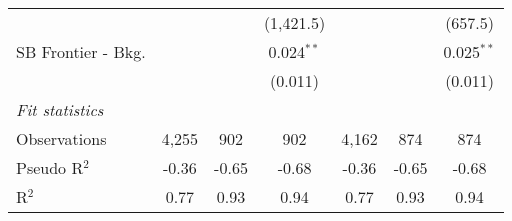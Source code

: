 \begin{tabular}{lcccccc}
                                &               &             & (1,421.5)      &               &         & (657.5)\\   
   SB Frontier - Bkg.           &               &             & 0.024$^{**}$   &               &         & 0.025$^{**}$\\   
                                &               &             & (0.011)        &               &         & (0.011)\\   
   \midrule
   \emph{Fit statistics}\\
   Observations                 & 4,255         & 902         & 902            & 4,162         & 874     & 874\\  
   Pseudo R$^2$                 & -0.36         & -0.65       & -0.68          & -0.36         & -0.65   & -0.68\\  
   R$^2$                        & 0.77          & 0.93        & 0.94           & 0.77          & 0.93    & 0.94\\  
   

\end{tabular}
